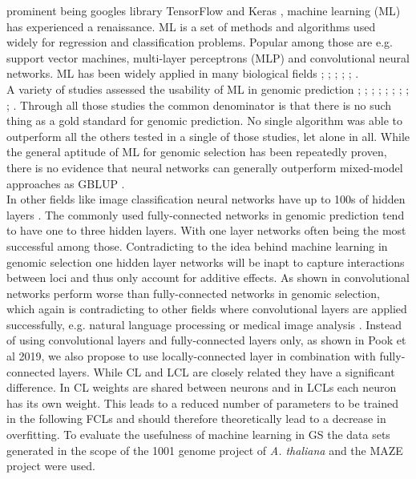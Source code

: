 prominent being googles library TensorFlow \cite{TF2016} and Keras \cite{keras2015},
machine learning (ML) has experienced a renaissance. ML is a set of methods and algorithms
used widely for regression and classification problems. Popular among those are
e.g. support vector machines, multi-layer perceptrons (MLP) and convolutional neural
networks. ML has been widely applied in many biological fields
\cite{mamoshina2016applications}; \cite{rampasek2016tensorflow}; \cite{angermueller2016};
\cite{min2017deep}; \cite{lan2018survey}; \cite{webb2018deep}. \\
A variety of studies assessed the usability of ML in genomic prediction
\cite{ogutu2011comparison}; \cite{gonza2012}; \cite{gonza2016}; \cite{qiu2016application};
\cite{ma2017deepgs}; \cite{gonzalez2018applications}; \cite{grinberg2018evaluation};
\cite{li2018genomic} \cite{montesinos2019benchmarking}; \cite{cuevas2019deep};
\cite{montesinos2019new}. Through all those studies the common denominator is that there
is no such thing as a gold standard for genomic prediction. No single algorithm was able
to outperform all the others tested in a single of those studies, let alone in all. While
the general aptitude of ML for genomic selection has been repeatedly proven, there is no
evidence that neural networks can generally outperform
mixed-model approaches as GBLUP \cite{hayes2001}. \\
In other fields like image classification neural networks have up to 100s of hidden layers
\cite{he2016deep}. The commonly used fully-connected networks in genomic prediction tend
to have one to three hidden layers. With one layer networks often being the most
successful among those. Contradicting to the idea behind machine learning in genomic
selection one hidden layer networks will be inapt to capture interactions between loci and
thus only account for additive effects. As shown in \cite{azodi2019} convolutional
networks perform worse than fully-connected networks in genomic selection, which again is
contradicting to other fields where convolutional layers are applied successfully, e.g.
natural language processing \cite{dos2014deep} or medical image analysis
\cite{litjens2017survey}. Instead of using convolutional layers and fully-connected layers
only, as shown in Pook et al 2019, we also propose to use locally-connected layer in
combination with fully-connected layers. While CL and LCL are closely related they have a
significant difference. In CL weights are shared between neurons and in LCLs each neuron
has its own weight. This leads to a reduced number of parameters to be trained in the
following FCLs and should therefore theoretically lead to a decrease in overfitting. To
evaluate the usefulness of machine learning in GS the data sets generated in the scope of
the 1001 genome project of \textit{A. thaliana} \cite{1001genome} and the MAZE project
were used.

